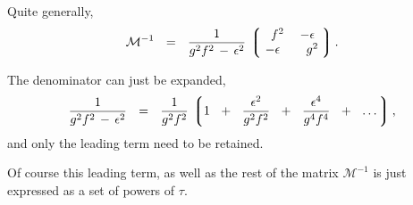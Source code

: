 \documentclass[12pt]{article}
\def\beq{\begin{equation}}
\def\eeq{\end{equation}}
\newcommand{\mc}[1]{\mathcal{#1}}
\newcommand{\ph}{\phantom}
\newcommand{\lgr}{\left\lgroup}
\newcommand{\rgr}{\right\rgroup}
\begin{document}
	
	Quite generally,
\beq
	\mc{M}^{-1}   ~~=~~    \frac{1}{g^2 f^2 \,-\, \epsilon^2}\,
					\lgr \begin{matrix}
						\ph{-} f^2    &    -\epsilon    \\
						-\epsilon   &    \ph- g^2
					\end{matrix} \;\rgr  .
\eeq
	
	The denominator can just be expanded,
\beq
	\frac{1}{g^2 f^2 \,-\, \epsilon^2}    ~~=~~    
		\frac{1}{g^2 f^2}\, 
		\lgr  1  ~~+~~  \frac{\epsilon^2}{g^2f^2}  ~~+~~  \frac{\epsilon^4}{g^4 f^4}  ~~+~~  \dots \rgr,
\eeq
	and only the leading term need to be retained.

	Of course this leading term, as well as the rest of the matrix $ \mc{M}^{-1} $ is just expressed
	as a set of powers of $ \tau $.
\end{document}
